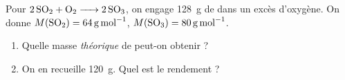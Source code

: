 \documentclass[11pt,a4paper]{article}
\begin{document}
\begin{exo}
Pour $\ce{2 SO2 + O2 -> 2 SO3}$, on engage \qty{128}{\gram} de  dans un excès d'oxygène.
On donne $M(\ce{SO2})=\qty{64}{\gram\per\mole}$, $M(\ce{SO3})=\qty{80}{\gram\per\mole}$.
\begin{enumerate}[label=\alph*)]
  \item Quelle masse \emph{théorique} de  peut-on obtenir ?
  \item On en recueille \qty{120}{\gram}. Quel est le rendement ?
\end{enumerate}
\end{exo}
\end{document}
